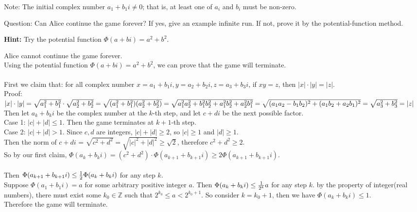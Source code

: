 \documentclass[11pt,addpoints]{exam}
\begin{document}
\begin{questions}
     Note: The initial complex number $a_1 + b_1i \neq 0$; that is, at least one of $a_i$ and $b_i$ must be non-zero.

     
    Question: Can Alice continue the game forever? If yes, give an example infinite run. If not, prove it by the potential-function method.

    \textbf{Hint:} Try the potential function $\Phi(a+bi)=a^2+b^2$.
    
    \begin{solution}
    Alice cannot continue the game forever.\\
    Using the potential function $\Phi(a+bi)=a^2+b^2$, we can prove that the game will terminate.\\
    \\First we claim that: for all complex number $x = a_1+b_1i, y= a_2+b_2i, z=a_3+b_3i$, if $xy = z$, then $|x| \cdot |y| = |z|$.\\
    Proof: $|x| \cdot |y| = \sqrt{a_1^2+b_1^2} \cdot \sqrt{a_2^2+b_2^2} = \sqrt{(a_1^2+b_1^2)(a_2^2+b_2^2)} = \sqrt{a_1^2a_2^2 + b_1^2b_2^2 + a_1^2b_2^2 + a_2^2b_1^2} \\= \sqrt{(a_1a_2-b_1b_2)^2+(a_1b_2+a_2b_1)^2} = \sqrt{a_3^2 + b_3^2} = |z|$\\

    Then let $a_k+b_ki$ be the complex number at the $k$-th step, and let $c+di$ be the next possible factor.\\
    Case 1: $|c|+|d|\leq1$. Then the game terminates at $k+1$-th step.\\
    Case 2: $|c|+|d| > 1$. Since $c, d$ are integers, $|c|+|d|\geq2$, so $|c| \geq 1$ and $|d| \geq 1$.\\
    Then the norm of $c+di$ = $\sqrt{c^2+d^2} = \sqrt{|c|^2+|d|^2} \geq \sqrt{2}$, therefore $c^2 + d^2 \geq 2$.\\
    So by our first claim, $\Phi(a_{k}+b_{k}i) = (c^2 +d^2) \cdot \Phi(a_{k+1} + b_{k+1}i) \geq 2 \Phi(a_{k+1} + b_{k+1}i)$.\\
    \\
    Then $\Phi(a_{k+1}+b_{k+1}i) \leq {1\over2} \Phi(a_k+b_ki)$ for any step $k$.\\
    Suppose $\Phi(a_{1}+b_{1}i) = a$ for some arbitrary positive integer $a$. Then $\Phi(a_{k}+b_{k}i) \leq {1\over2^k} a$ for any step $k$. by the property of integer(real numbers), there must exist some $k_0\in \mathbb{Z}$ such that $2^{k_0} \leq a < 2^{k_0 + 1}$. So consider $k = k_0 + 1$, then we have $\Phi(a_{k}+b_{k}i) \leq 1$.\\
    Therefore the game will terminate.


\end{solution}
\end{questions}
\end{document}
